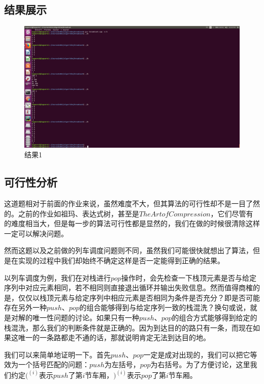 \documentclass[UTF8]{ctexart}
\begin{document}
	\subsection{结果展示}

\begin{figure}[H]
	\centering 
	\includegraphics[scale=0.5]{res.png} 
	\caption{结果1} 
	\label{res1}
\end{figure}

	\subsection{可行性分析}
	\indent 这道题相对于前面的作业来说，虽然难度不大，但其算法的可行性却不是一目了然的。之前的作业如祖玛、表达式树，甚至是$The Art of Compression$，它们尽管有的难度相当大，但是每一步的算法可行性都是显然的，我们在做的时候很清除这样一定可以解决问题。
	
	\indent 然而这题以及之前做的列车调度问题则不同，虽然我们可能很快就想出了算法，但是在实现的过程中我们却始终不确定这样是否一定能得到正确的结果。
	
	\indent 以列车调度为例，我们在对栈进行$pop$操作时，会先检查一下栈顶元素是否与给定序列中对应元素相同，若不相同则直接退出循环并输出失败信息。然而值得商榷的是，\textcolor[rgb]{1,0,0}{仅仅以栈顶元素与给定序列中相应元素是否相同为条件是否充分}？\textcolor[rgb]{0.8,0.1,0.1}{即是否可能存在另外一种$push$、$pop$的组合能够得到与给定序列一致的栈混洗}？换句或说，就是对\textcolor[rgb]{0.8,0.1,0.1}{解的唯一性问题}的讨论。如果只有一种$push$、$pop$的组合方式能够得到给定的栈混洗，那么我们的判断条件就是正确的。因为到达目的的路只有一条，而现在如果这唯一的一条路都走不通的话，那就说明肯定无法到达目的地。
	
	\indent 我们可以来简单地证明一下。首先$push$、$pop$一定是成对出现的，我们可以把它等效为一个括号匹配的问题：$push$为左括号，$pop$为右括号。为了方便讨论，这里我们约定$(^{(i)}$表示$push$了第$i$节车厢，$)^{(i)}$表示$pop$了第$i$节车厢。
	
\end{document}
